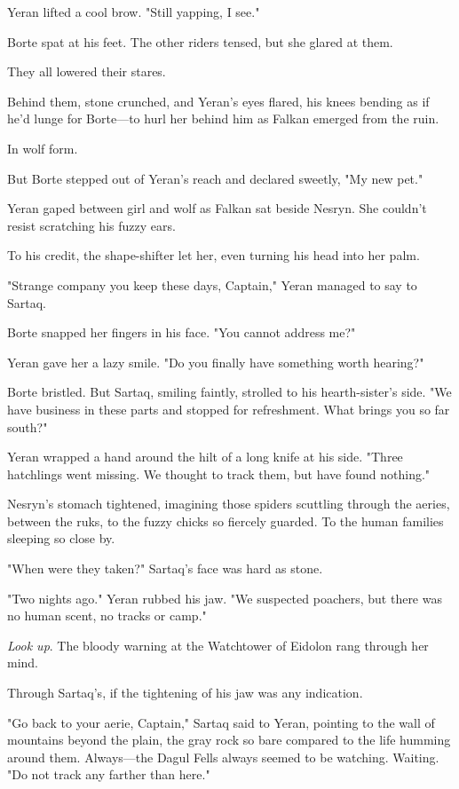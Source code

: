 Yeran lifted a cool brow. "Still yapping, I see."

Borte spat at his feet. The other riders tensed, but she glared at them.

They all lowered their stares.

Behind them, stone crunched, and Yeran's eyes flared, his knees bending as if he'd lunge for Borte---to hurl her behind him as Falkan emerged from the ruin.

In wolf form.

But Borte stepped out of Yeran's reach and declared sweetly, "My new pet."

Yeran gaped between girl and wolf as Falkan sat beside Nesryn. She couldn't resist scratching his fuzzy ears.

To his credit, the shape-shifter let her, even turning his head into her palm.

"Strange company you keep these days, Captain," Yeran managed to say to Sartaq.

Borte snapped her fingers in his face. "You cannot address me?"

Yeran gave her a lazy smile. "Do you finally have something worth hearing?"

Borte bristled. But Sartaq, smiling faintly, strolled to his hearth-sister's side. "We have business in these parts and stopped for refreshment. What brings you so far south?"

Yeran wrapped a hand around the hilt of a long knife at his side. "Three hatchlings went missing. We thought to track them, but have found nothing."

Nesryn's stomach tightened, imagining those spiders scuttling through the aeries, between the ruks, to the fuzzy chicks so fiercely guarded. To the human families sleeping so close by.

"When were they taken?" Sartaq's face was hard as stone.

"Two nights ago." Yeran rubbed his jaw. "We suspected poachers, but there was no human scent, no tracks or camp."

\emph{Look up}. The bloody warning at the Watchtower of Eidolon rang through her mind.

Through Sartaq's, if the tightening of his jaw was any indication.

"Go back to your aerie, Captain," Sartaq said to Yeran, pointing to the wall of mountains beyond the plain, the gray rock so bare compared to the life humming around them. Always---the Dagul Fells always seemed to be watching. Waiting. "Do not track any farther than here."

